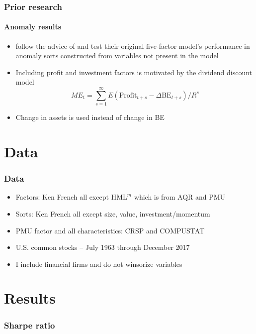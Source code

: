 \documentclass[notes]{beamer}  %
\begin{document}
\begin{frame} \frametitle{Prior research} \framesubtitle{Anomaly results}
  \begin{itemize}
    \item \textcite{fama2016dissecting} follow the advice of
    \textcite{lewellen2010skeptical} and test their original five-factor
    model's performance in anomaly sorts constructed from variables not present
    in the model
    \item Including profit and investment factors is motivated by the dividend
    discount model \parencite{fama2006profitability}
    \[ME_t =
    \sum_{s=1}^\infty E\left( \text{Profit}_{t+s}-
    \Delta\text{BE}_{t+s}\right) /R^s\]
    \item Change in assets is used instead of change in BE
  \end{itemize}
\end{frame}

\section{Data}

\begin{frame}
  \frametitle{Data}
  \begin{itemize}
    \item Factors: Ken French all except $\text{HML}^m$ which is from AQR
    and PMU
    \item Sorts: Ken French all except size, value, investment/momentum
    \item PMU factor and all characteristics: CRSP and COMPUSTAT
    \item U.S. common stocks -- July 1963 through December 2017
    \item I include financial firms and do not winsorize variables
  \end{itemize}
\end{frame}

\section{Results}

\begin{frame}
\frametitle{Sharpe ratio}
\resizebox{\linewidth}{!}{}
\end{frame}

\end{document}
